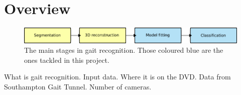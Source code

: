 \section{Overview}

\begin{figure}[b]
	\centering
	\includegraphics[width=12cm]{overview.png}
	\caption{The main stages in gait recognition.
		Those coloured blue are the ones tackled in this project.}
	\label{OverviewBoxes}
\end{figure}

What is gait recognition.
Input data.  Where it is on the DVD.
Data from Southampton Gait Tunnel.
Number of cameras.


